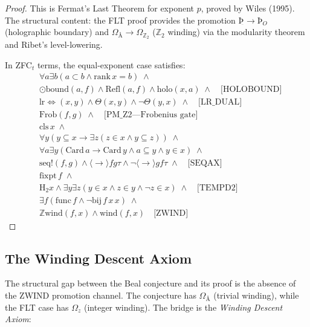 \documentclass[12pt]{article}
\begin{document}
\begin{proof}
This is Fermat's Last Theorem for exponent $p$, proved by Wiles (1995).
The structural content: the FLT proof provides the promotion
$\text{Þ}_{\ddot{}} \to \text{Þ}_O$ (holographic boundary) and
$\Omega_{\text{Å}} \to \Omega_{\mathbb{Z}_2}$ ($\mathbb{Z}_2$ winding)
via the modularity theorem and Ribet's level-lowering.

In ZFC${}_t$ terms, the equal-exponent case satisfies:
\begin{equation}\label{eq:flt_zfc}
\begin{aligned}
&\forall a\exists b(a\subset b \land \text{rank}\,x=b) \;\land \\
&\odot\text{bound}(a,f) \land \text{Refl}(a,f) \land \text{holo}(x,a)
   \;\land \quad\text{[HOLOBOUND]} \\
&\text{lr}{\Leftrightarrow}(x,y) \land \Theta(x,y) \land \lnot\Theta(y,x)
   \;\land \quad\text{[LR\_DUAL]} \\
&\text{Frob}(f,g) \;\land \quad\text{[PM\_Z2---Frobenius gate]} \\
&\text{cls}\,x \;\land \\
&\forall y(y\subseteq x \to \exists z(z\in x \land y\subseteq z)) \;\land \\
&\forall a\exists y(\text{Card}\,a \to \text{Card}\,y \land a\subseteq y
   \land y\in x) \;\land \\
&\text{seq!}(f,g) \land \langle\to\rangle f g \tau \land
   \lnot\langle\to\rangle g f \tau \;\land \quad\text{[SEQAX]} \\
&\text{fixpt}\,f \;\land \\
&\text{H}_2 x \land \exists y\exists z(y\in x \land z\in y \land
   \lnot z\in x) \;\land \quad\text{[TEMPD2]} \\
&\exists f(\text{func}\,f \land \lnot\text{bij}\,f\,x\,x) \;\land \\
&\mathbb{Z}\text{wind}(f,x) \land \text{wind}(f,x)
   \quad\text{[ZWIND]}
\end{aligned}
\end{equation}
\end{proof}

\subsection{The Winding Descent Axiom}

The structural gap between the Beal conjecture and its proof is the
absence of the ZWIND promotion channel. The conjecture has $\Omega_{\text{Å}}$
(trivial winding), while the FLT case has $\Omega_z$ (integer winding).
The bridge is the \emph{Winding Descent Axiom}:
\end{document}
